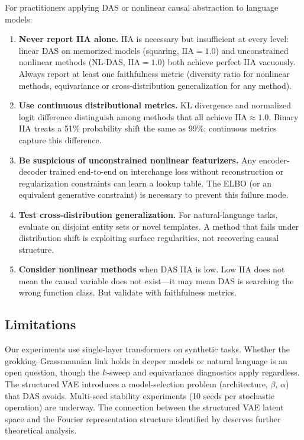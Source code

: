 \documentclass{article}
\newcommand{\IIA}{\mathrm{IIA}}
\begin{document}
For practitioners applying DAS or nonlinear causal abstraction to language
models:
\begin{enumerate}
\item \textbf{Never report IIA alone.} IIA is necessary but insufficient at
  every level: linear DAS on memorized models (squaring, $\IIA = 1.0$) and
  unconstrained nonlinear methods (NL-DAS, $\IIA = 1.0$) both achieve
  perfect IIA vacuously. Always report at least one faithfulness metric
  (diversity ratio for nonlinear methods, equivariance or cross-distribution
  generalization for any method).
\item \textbf{Use continuous distributional metrics.} KL divergence and
  normalized logit difference distinguish among methods that all achieve
  $\IIA \approx 1.0$. Binary IIA treats a 51\% probability shift the same as
  99\%; continuous metrics capture this difference.
\item \textbf{Be suspicious of unconstrained nonlinear featurizers.} Any
  encoder-decoder trained end-to-end on interchange loss without reconstruction
  or regularization constraints can learn a lookup table. The ELBO
  (or an equivalent generative constraint) is necessary to prevent this
  failure mode.
\item \textbf{Test cross-distribution generalization.} For natural-language
  tasks, evaluate on disjoint entity sets or novel templates. A method that
  fails under distribution shift is exploiting surface regularities, not
  recovering causal structure.
\item \textbf{Consider nonlinear methods} when DAS IIA is low. Low IIA does not
  mean the causal variable does not exist---it may mean DAS is searching the
  wrong function class. But validate with faithfulness metrics.
\end{enumerate}

\subsection{Limitations}

Our experiments use single-layer transformers on synthetic tasks. Whether the
grokking--Grassmannian link holds in deeper models or natural language is an open
question, though the $k$-sweep and equivariance diagnostics apply regardless. The
structured VAE introduces a model-selection problem (architecture, $\beta$,
$\alpha$) that DAS avoids. Multi-seed stability experiments (10 seeds per
stochastic operation) are underway. The connection between the structured VAE
latent space and the Fourier representation structure identified by
\citet{nanda2023progress} deserves further theoretical analysis.
\end{document}
